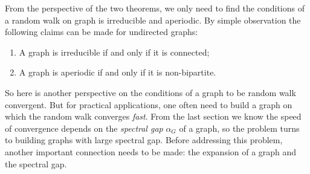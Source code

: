 From the perspective of the two theorems, we only need to find the
conditions of a random walk on graph is irreducible and aperiodic.
By simple observation the following claims can be made for
undirected graphs:

\begin{enumerate}
\item A graph is irreducible if and only if it is connected;
\item A graph is aperiodic if and only if it is non-bipartite.
\end{enumerate}

So here is another perspective on the conditions of a graph to be
random walk convergent. But for practical applications, one often
need to build a graph on which the random walk converges
\emph{fast}. From the last section we know the speed of convergence
depends on the \emph{spectral gap} $\alpha_G$ of a graph, so the
problem turns to building graphs with large spectral gap. Before
addressing this problem, another important connection needs to be
made: the expansion of a graph and the spectral gap.
